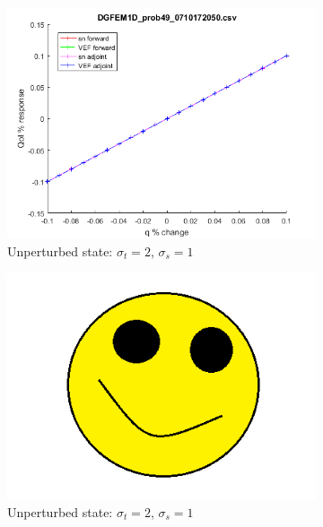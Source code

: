 \documentclass[12pt]{report}
\newcommand{\sigt}{\sigma_t}
\newcommand{\sigs}{\sigma_s}
\begin{document}
\begin{figure}[H]
\label{InHomoPertq}
\centering
\begin{subfigure}{.5\textwidth}
  \centering
  \includegraphics[width=.98\linewidth]{figures/49qSens.png}
  \caption{Unperturbed state: $\sigt=2$, $\sigs=1$}
  \label{fig:sfig1}
\end{subfigure}%
\begin{subfigure}{.5\textwidth}
  \centering
  \includegraphics[width=.98\linewidth]{figures/holder.png}
  \caption{Unperturbed state: $\sigt=2$, $\sigs=1$}
  \label{fig:sfig4}
\end{subfigure}%
\\
\begin{subfigure}{.5\textwidth}
  \centering

\end{subfigure}
\end{figure}
\end{document}

